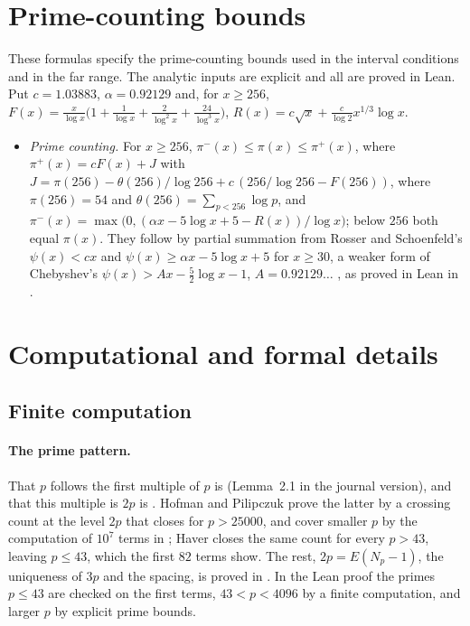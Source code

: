 \documentclass[11pt]{article}
\theoremstyle{definition}
\theoremstyle{remark}
\newcommand{\piU}{\pi^{+}}
\newcommand{\piL}{\pi^{-}}
\begin{document}
\begin{appendices}
\section{Prime-counting bounds}\label{app:prime}

These formulas specify the prime-counting bounds used in the interval
conditions and in the far range.
The analytic inputs are explicit and all are proved in Lean. Put
$c=1.03883$, $\alpha=0.92129$ and, for $x\ge256$,
$F(x)=\frac{x}{\log x}\bigl(1+\frac1{\log x}+\frac2{\log^2x}+\frac{24}{\log^3x}\bigr)$,
$R(x)=c\sqrt x+\frac{c}{\log2}x^{1/3}\log x$.
\begin{itemize}
\item[(P)] \emph{Prime counting.} For $x\ge256$,
  $\piL(x)\le\pi(x)\le\piU(x)$, where
  $\piU(x)=cF(x)+J$ with
  $J=\pi(256)-\theta(256)/\log256+c\,(256/\log256-F(256))$, where
  $\pi(256)=54$ and $\theta(256)=\sum_{p<256}\log p$, and
  $\piL(x)=\max\bigl(0,(\alpha x-5\log x+5-R(x))/\log x\bigr)$; below $256$
  both equal $\pi(x)$. They follow by partial summation from
  Rosser and Schoenfeld's $\psi(x)<cx$ \cite[Theorem~12]{rs} and
  $\psi(x)\ge\alpha x-5\log x+5$ for $x\ge30$, a weaker form of
  Chebyshev's $\psi(x)>Ax-\frac52\log x-1$, $A=0.92129\ldots$
  \cite[\S V]{chebyshev}, as proved in Lean in \cite{ieantn}.
\end{itemize}

\section{Computational and formal details}\label{app:checks}

\subsection{Finite computation}\label{sec:finite}

\paragraph{The prime pattern.}
  That $p$ follows the first multiple of $p$ is \cite[Lemma~1]{lrs}
  (Lemma~2.1 in the journal version), and that this multiple is $2p$ is
  \cite[Theorem~4.3]{hp}. Hofman and Pilipczuk prove the latter by a
  crossing count at the level $2p$ that closes for $p>25000$, and cover
  smaller $p$ by the computation of $10^7$ terms in \cite{lrs}; Haver
  \cite[Remark~3]{haver} closes the same count for every $p>43$, leaving
  $p\le43$, which the first $82$ terms show. The rest, $2p=E(N_p-1)$, the
  uniqueness of $3p$ and the spacing, is proved in
  \cite[(F2)]{haver}. In the Lean proof the primes $p\le43$ are
  checked on the first terms, $43<p<4096$ by a finite computation, and
  larger $p$ by explicit prime bounds.




\end{appendices}
\end{document}
